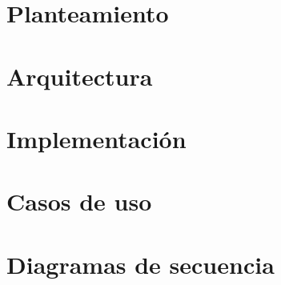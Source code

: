 \section{Planteamiento}


\section{Arquitectura}


\section{Implementación}


\newpage
\section{Casos de uso}


\section{Diagramas de secuencia}


        
